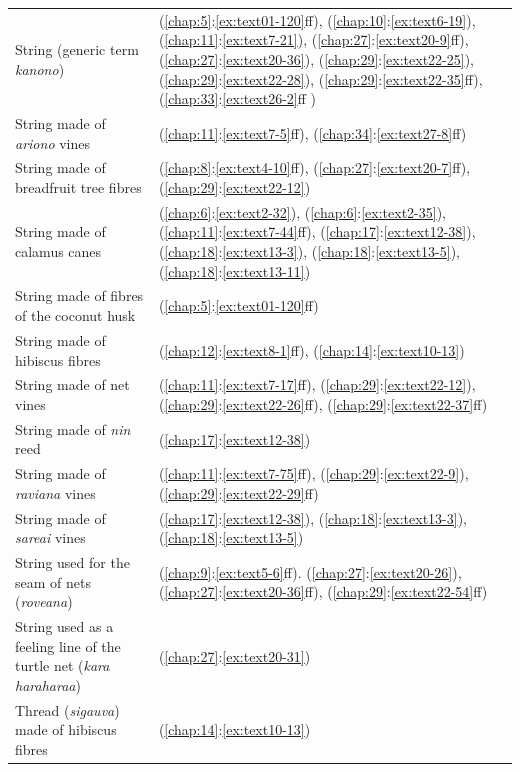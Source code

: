 \begin{tabularx}{\textwidth}{p{7cm}X}
    String (generic term \textit{kanono})&(\ref{chap:5}:\ref{ex:text01-120}ff), (\ref{chap:10}:\ref{ex:text6-19}), (\ref{chap:11}:\ref{ex:text7-21}), (\ref{chap:27}:\ref{ex:text20-9}ff), (\ref{chap:27}:\ref{ex:text20-36}), (\ref{chap:29}:\ref{ex:text22-25}), (\ref{chap:29}:\ref{ex:text22-28}), (\ref{chap:29}:\ref{ex:text22-35}ff), (\ref{chap:33}:\ref{ex:text26-2}ff )\\
    String made of \textit{ariono} vines&(\ref{chap:11}:\ref{ex:text7-5}ff), (\ref{chap:34}:\ref{ex:text27-8}ff)\\
    String made of breadfruit tree fibres& (\ref{chap:8}:\ref{ex:text4-10}ff), (\ref{chap:27}:\ref{ex:text20-7}ff), (\ref{chap:29}:\ref{ex:text22-12})\\
    String made of calamus canes&(\ref{chap:6}:\ref{ex:text2-32}), (\ref{chap:6}:\ref{ex:text2-35}), (\ref{chap:11}:\ref{ex:text7-44}ff), (\ref{chap:17}:\ref{ex:text12-38}), (\ref{chap:18}:\ref{ex:text13-3}), (\ref{chap:18}:\ref{ex:text13-5}), (\ref{chap:18}:\ref{ex:text13-11})\\
    String made of fibres of the coconut husk&(\ref{chap:5}:\ref{ex:text01-120}ff)\\
    String made of hibiscus fibres&(\ref{chap:12}:\ref{ex:text8-1}ff), (\ref{chap:14}:\ref{ex:text10-13})\\
    String made of net vines&(\ref{chap:11}:\ref{ex:text7-17}ff), (\ref{chap:29}:\ref{ex:text22-12}), (\ref{chap:29}:\ref{ex:text22-26}ff), (\ref{chap:29}:\ref{ex:text22-37}ff)\\
    String made of \textit{nin} reed&(\ref{chap:17}:\ref{ex:text12-38})\\
    String made of \textit{raviana} vines&(\ref{chap:11}:\ref{ex:text7-75}ff), (\ref{chap:29}:\ref{ex:text22-9}), (\ref{chap:29}:\ref{ex:text22-29}ff)\\
    String made of \textit{sareai} vines&(\ref{chap:17}:\ref{ex:text12-38}), (\ref{chap:18}:\ref{ex:text13-3}), (\ref{chap:18}:\ref{ex:text13-5})\\
    String used for the seam of nets (\textit{roveana})&(\ref{chap:9}:\ref{ex:text5-6}ff). (\ref{chap:27}:\ref{ex:text20-26}), (\ref{chap:27}:\ref{ex:text20-36}ff), (\ref{chap:29}:\ref{ex:text22-54}ff)\\
    String used as a feeling line of the turtle net (\textit{kara haraharaa})&(\ref{chap:27}:\ref{ex:text20-31})\\
    Thread (\textit{sigauva}) made of hibiscus fibres&(\ref{chap:14}:\ref{ex:text10-13})\\
\end{tabularx}

